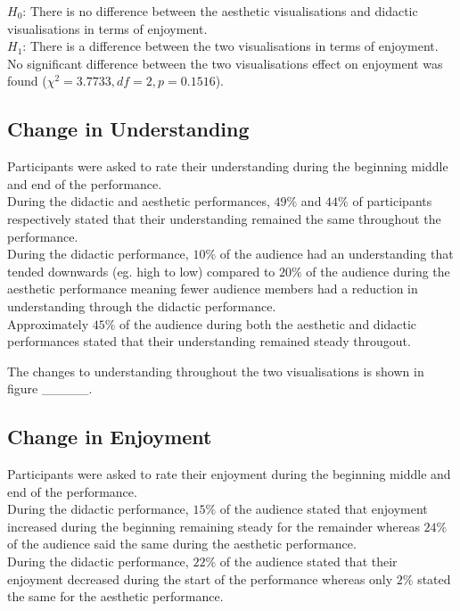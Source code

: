 \documentclass[12pt]{article}
\begin{document}
$H_0$: There is no difference between the aesthetic visualisations and didactic visualisations in terms of enjoyment.\\
$H_1$: There is a difference between the two visualisations in terms of enjoyment.\\

No significant difference between the two visualisations effect on enjoyment was found ($\chi^2=3.7733,df=2,p=0.1516$).

\subsection{Change in Understanding}

Participants were asked to rate their understanding during the beginning middle and end of the performance.\\

During the didactic and aesthetic performances, $49\%$ and $44\%$ of participants respectively stated that their understanding remained the same throughout the performance.\\

During the didactic performance, $10\%$ of the audience had an understanding that tended downwards (eg. high to low) compared to $20\%$ of the audience during the aesthetic performance meaning fewer audience members had a reduction in understanding through the didactic performance.\\

Approximately $45\%$ of the audience during both the aesthetic and didactic performances stated that their understanding remained steady througout.

The changes to understanding throughout the two visualisations is shown in figure \_\_\_\_\_.

\subsection{Change in Enjoyment}

Participants were asked to rate their enjoyment during the beginning middle and end of the performance.\\

During the didactic performance, $15\%$ of the audience stated that enjoyment increased during the beginning remaining steady for the remainder whereas $24\%$ of the audience said the same during the aesthetic performance.\\

During the didactic performance, $22\%$ of the audience stated that their enjoyment decreased during the start of the performance whereas only $2\%$ stated the same for the aesthetic performance.\\
\end{document}
